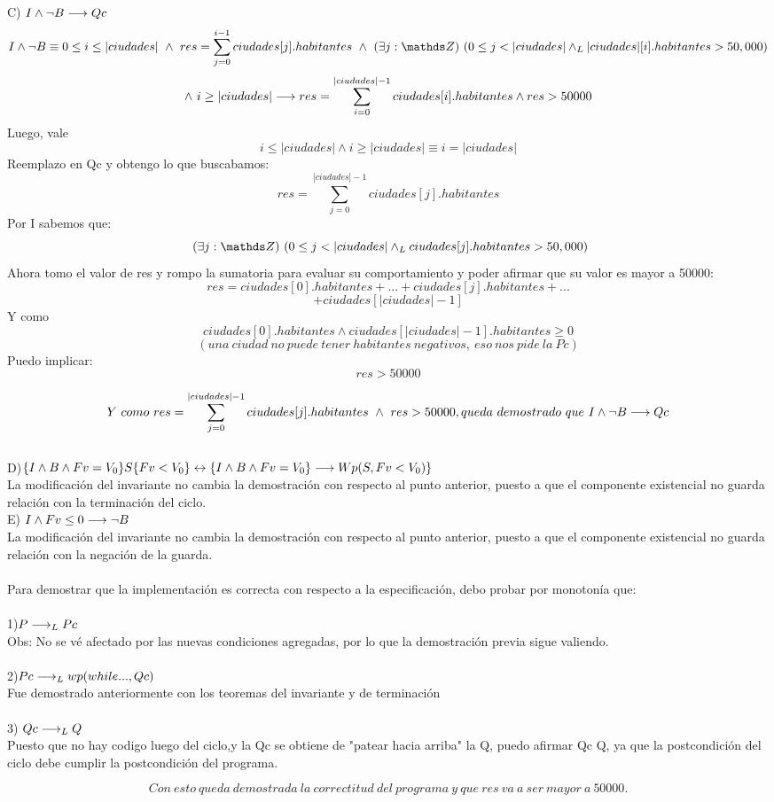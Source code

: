 \documentclass[10pt,a4paper]{article}
\begin{document}
C) $I \land \neg B \longrightarrow Qc$\\
	\[I \land \neg B \equiv 0\leq i \leq |ciudades| \ \land \ res = \sum\limits_{j=0}^{i-1}ciudades[j].habitantes \  \land \  \existe[unalinea]j{\ent}{0\leq j <|ciudades| \yLuego |ciudades|[i].habitantes > 50,000} \]
	\[ \land \ i \geq |ciudades| \longrightarrow res = \sum\limits_{i=0}^{|ciudades|-1}ciudades[i].habitantes \land res>50000  \]
Luego, vale \[i \leq |ciudades| \land i \geq |ciudades| \equiv i=|ciudades|\]	
Reemplazo en Qc y obtengo lo que buscabamos:
	\[res= \sum\limits_{j=0}^{|ciudades|-1}ciudades[j].habitantes  \]
Por I sabemos que:
\[ \ \existe[unalinea]j{\ent}{0\leq j <|ciudades| \yLuego ciudades[j].habitantes > 50,000}  \]
Ahora tomo el valor de res y rompo la sumatoria para evaluar su comportamiento y poder afirmar que su valor es mayor a 50000:
	\[res = ciudades[0].habitantes+...+ciudades[j].habitantes+...\]
	\[+ciudades[|ciudades|-1]  \]
Y como 
 \[ciudades[0].habitantes \land ciudades[|ciudades|-1] .habitantes \geq 0\] \[(una \ ciudad  \   no\ puede \ tener \ habitantes\  negativos, \ eso \ nos\ pide\ la\ Pc)\]
Puedo implicar:
	\[res >50000\]

	\[Y \ como \ res= \sum\limits_{j=0}^{|ciudades|-1}ciudades[j].habitantes \ \land \ res>50000, queda \ demostrado \ que \ I \land \neg B \implica Qc   \] \\

D)$\{I \land B \land Fv = V_0\} S \{Fv < V_0\} \leftrightarrow \{I \land B \land Fv = V_0\} \longrightarrow Wp (S, Fv < V_0 )\}$\\ La modificación del invariante no cambia la demostración con respecto al punto anterior, puesto a que el componente existencial no guarda relación con la terminación del ciclo. \\

E) $I \land Fv \leq 0 \longrightarrow \neg B$\\ La modificación del invariante no cambia la demostración con respecto al punto anterior, puesto a que el componente existencial no guarda relación con la negación de la guarda.
\\
\\
Para demostrar que la implementación es correcta con respecto a la especificación, debo probar por monotonía que:\\ \\
1)$ P\longrightarrow _L Pc$\\ \hspace{0.5cm}
Obs: No se vé afectado por las nuevas condiciones agregadas, por lo que la demostración previa sigue valiendo.
\\ \\
2)$Pc \longrightarrow _L wp(while..., Qc)$ \\ \hspace{0.5cm}
Fue demostrado anteriormente con los teoremas del invariante y de terminación \\ \\
3) $Qc \longrightarrow _L Q$ \\
Puesto que no hay codigo luego del ciclo,y la Qc se obtiene de "patear hacia arriba" la Q, puedo afirmar Qc \implica Q, ya que la postcondición del ciclo debe cumplir la postcondición del programa.


\[Con\ esto\ queda\ demostrada\ la\ correctitud\ del\ programa\ y\ que\ res\ va\ a\ ser\ mayor\ a\ 50000.\]
\end{document}
